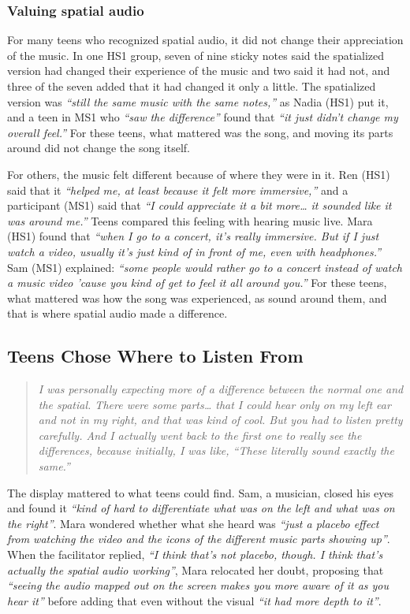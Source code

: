 \subsubsection{Valuing spatial audio}

For many teens who recognized spatial audio, it did not change their appreciation of the music. In one HS1 group, seven of nine sticky notes said the spatialized version had changed their experience of the music and two said it had not, and three of the seven added that it had changed it only a little. The spatialized version was \textit{``still the same music with the same notes,''} as Nadia (HS1) put it, and a teen in MS1 who \textit{``saw the difference''} found that \textit{``it just didn't change my overall feel.''} For these teens, what mattered was the song, and moving its parts around did not change the song itself.

For others, the music felt different because of where they were in it. Ren (HS1) said that it \textit{``helped me, at least because it felt more immersive,''} and a participant (MS1) said that \textit{``I could appreciate it a bit more\ldots{} it sounded like it was around me.''} Teens compared this feeling with hearing music live. Mara (HS1) found that \textit{``when I go to a concert, it's really immersive. But if I just watch a video, usually it's just kind of in front of me, even with headphones.''} Sam (MS1) explained: \textit{``some people would rather go to a concert instead of watch a music video 'cause you kind of get to feel it all around you.''} For these teens, what mattered was how the song was experienced, as sound around them, and that is where spatial audio made a difference.

\subsection{Teens Chose Where to Listen From}

\begin{quote}
\textit{I was personally expecting more of a difference between the normal one and the spatial. There were some parts\ldots{} that I could hear only on my left ear and not in my right, and that was kind of cool. But you had to listen pretty carefully. And I actually went back to the first one to really see the differences, because initially, I was like, ``These literally sound exactly the same.''}
\end{quote}

The display mattered to what teens could find. Sam, a musician, closed his eyes and found it \textit{``kind of hard to differentiate what was on the left and what was on the right''}. Mara wondered whether what she heard was \textit{``just a placebo effect from watching the video and the icons of the different music parts showing up''}. When the facilitator replied, \textit{``I think that's not placebo, though. I think that's actually the spatial audio working''}, Mara relocated her doubt, proposing that \textit{``seeing the audio mapped out on the screen makes you more aware of it as you hear it''} before adding that even without the visual \textit{``it had more depth to it''}.

